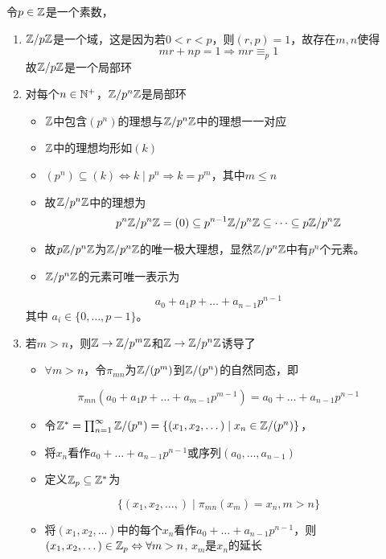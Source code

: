 \documentclass[11pt]{article}
\begin{document}
\begin{examplle}[]
令\(p\in\mathbb{Z}\)是一个素数，
\begin{enumerate}
\item \(\mathbb{Z}/p\mathbb{Z}\)是一个域，这是因为若\(0<r<p\)，则\((r,p)=1\)，故存在\(m,n\)使得
\begin{equation*}
mr+np=1\Rightarrow mr\equiv_p1
\end{equation*}
故\(\mathbb{Z}/p\mathbb{Z}\)是一个局部环
\item 对每个\(n\in\mathbb{N}^+\)，\(\mathbb{Z}/p^n\mathbb{Z}\)是局部环
\begin{itemize}
\item \(\mathbb{Z}\)中包含\((p^n)\)的理想与\(\mathbb{Z}/p^n\mathbb{Z}\)中的理想一一对应
\item \(\mathbb{Z}\)中的理想均形如\((k)\)
\item \((p^n)\subseteq(k)\Leftrightarrow k\mid p^n\Rightarrow k=p^m\)，其中\(m\le n\)
\item 故\(\mathbb{Z}/p^n\mathbb{Z}\)中的理想为
\begin{equation*}
p^n\mathbb{Z}/p^n\mathbb{Z}=(0)\subseteq p^{n-1}\mathbb{Z}/p^n\mathbb{Z}\subseteq\dots\subseteq p\mathbb{Z}/p^n\mathbb{Z}
\end{equation*}
\item 故\(p\mathbb{Z}/p^n\mathbb{Z}\)为\(\mathbb{Z}/p^n\mathbb{Z}\)的唯一极大理想，显然\(\mathbb{Z}/p^n\mathbb{Z}\)中有\(p^n\)个元素。

\item \(\mathbb{Z}/p^n\mathbb{Z}\)的元素可唯一表示为
\end{itemize}
\begin{equation*}
a_0+a_1p+\dots+a_{n-1}p^{n-1}
\end{equation*}
其中 \(a_i\in\{0,\dots,p-1\}\)。
\item 若\(m>n\)，则\(\mathbb{Z}\to\mathbb{Z}/p^m\mathbb{Z}\)和\(\mathbb{Z}\to\mathbb{Z}/p^n\mathbb{Z}\)诱导了
\begin{center}\end{center}
\begin{itemize}
\item \(\forall m>n\)，令\(\pi_{mn}\)为\(\mathbb{Z}/(p^m)\)到\(\mathbb{Z}/(p^n)\)的自然同态，即
\end{itemize}
\begin{equation*}
\pi_{mn}(a_0+a_1p+\dots+a_{m-1}p^{m-1})=a_0+\dots+a_{n-1}p^{n-1}
\end{equation*}
\begin{itemize}
\item 令\(\mathbb{Z}^*=\prod_{n=1}^\infty\mathbb{Z}/(p^n)=\{(x_1,x_2,\dots)\mid x_n\in\mathbb{Z}/(p^n)\}\)，
\item 将\(x_n\)看作\(a_0+\dots+a_{n-1}p^{n-1}\)或序列\((a_0,\dots,a_{n-1})\)
\item 定义\(\mathbb{Z}_p\subseteq\mathbb{Z}^*\)为
\end{itemize}
\begin{equation*}
\{(x_1,x_2,\dots,)\mid\pi_{mn}(x_m)=x_n,m>n\}
\end{equation*}
\begin{itemize}
\item 将\((x_1,x_2,\dots)\)中的每个\(x_n\)看作\(a_0+\dots+a_{n-1}p^{n-1}\)，则\((x_1,x_2,\dots)\in \mathbb{Z}_p\Leftrightarrow\forall m>n\), \(x_m\)是\(x_n\)的延长


\end{itemize}
\end{enumerate}
\end{examplle}
\end{document}
